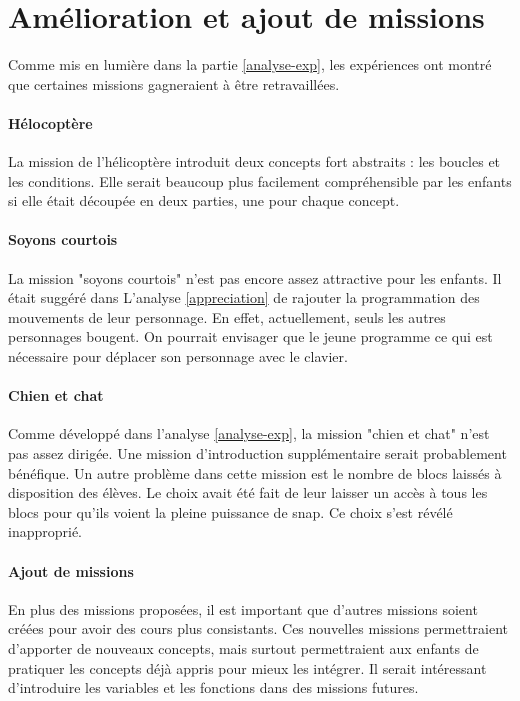 \section{Amélioration et ajout de missions}
Comme mis en lumière dans la partie \ref{analyse-exp}, les expériences ont montré que certaines \glspl{mission} gagneraient à être retravaillées.

\paragraph{Hélocoptère}
La \gls{mission} de l'hélicoptère introduit deux concepts fort abstraits : les boucles et les conditions. Elle serait beaucoup plus facilement compréhensible par les enfants si elle était découpée en deux parties, une pour chaque concept.

\paragraph{Soyons courtois}
La \gls{mission} "soyons courtois" n'est pas encore assez attractive pour les enfants. Il était suggéré dans L'analyse \ref{appreciation} de rajouter la programmation des mouvements de leur personnage. En effet, actuellement, seuls les autres personnages bougent. On pourrait envisager que le jeune programme ce qui est nécessaire pour déplacer son personnage avec le clavier.

\paragraph{Chien et chat}
Comme développé dans l'analyse \ref{analyse-exp}, la \gls{mission} "chien et chat" n'est pas assez dirigée. Une \gls{mission} d'introduction supplémentaire serait probablement bénéfique. Un autre problème dans cette \gls{mission} est le nombre de \glspl{bloc}  laissés à disposition des élèves. Le choix avait été fait de leur laisser un accès à tous les \glspl{bloc}  pour qu'ils voient la pleine puissance de \gls{snap}. Ce choix s'est révélé inapproprié.

\paragraph{Ajout de missions}
En plus des \glspl{mission} proposées, il est important que d'autres \glspl{mission} soient créées pour avoir des cours plus consistants. Ces nouvelles \glspl{mission} permettraient d'apporter de nouveaux concepts, mais surtout permettraient aux enfants de pratiquer les concepts déjà appris pour mieux les intégrer. Il serait intéressant d'introduire les variables et les fonctions dans des \glspl{mission} futures.


